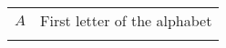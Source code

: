 %
\begin{longtable}[l]{@{}ll@{}}
    \( A \) & First letter of the alphabet\\
    \label{tab:glossar}
\end{longtable}
